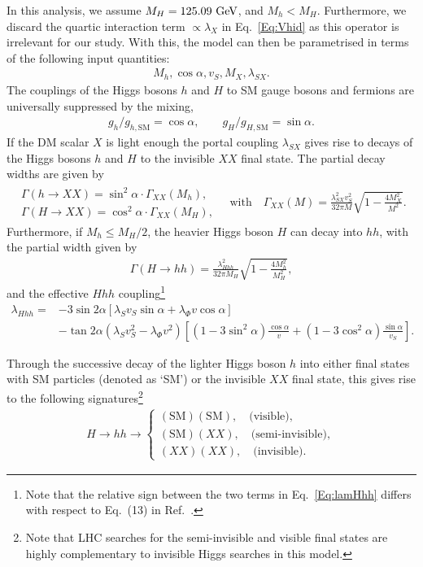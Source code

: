 \documentclass[../report.tex]{subfiles}
\begin{document}
In this analysis, we assume $M_H = 125.09~\text{GeV}$, and $M_h < M_H$. Furthermore, we discard the quartic interaction term $\propto \lambda_X$ in Eq.~\eqref{Eq:Vhid} as this operator is irrelevant for our study. With this, the model can then be parametrised in terms of the following input quantities:
\begin{align}
M_h, \cos\alpha, v_S, M_X, \lambda_{SX}.
\end{align}
The couplings of the Higgs bosons $h$ and $H$ to SM gauge bosons and fermions are universally suppressed by the mixing,
\begin{align}
g_h/g_{h,\mathrm{SM}} = \cos \alpha , \qquad g_H/g_{H,\mathrm{SM}} = \sin\alpha.
\end{align}
If the DM scalar $X$ is light enough the portal coupling $\lambda_{SX}$ gives rise to decays of the Higgs bosons $h$ and $H$ to the invisible $XX$ final state. The partial decay widths are given by
\begin{align}
\label{eq:invdecaywidth}
\begin{array}{l} \Gamma(h\to XX) = \sin^2\alpha \cdot \Gamma_{XX} (M_h), \\ \Gamma(H\to XX) = \cos^2\alpha \cdot \Gamma_{XX} (M_H), \end{array} \quad \mbox{with} \quad \Gamma_{XX}(M) = \frac{\lambda_{SX}^2 v_S^2 }{32\pi M} \sqrt{1 - \frac{4M_X^2}{M^2}}.
\end{align}
Furthermore, if $M_h \le M_H/2$, the heavier Higgs boson $H$ can decay into $hh$, with the partial width given by
\begin{align}
\Gamma(H\to hh) = \frac{\lambda_{Hhh}^2}{32\pi M_H} \sqrt{1 - \frac{4M_h^2}{M_H^2}},
\end{align}
and the effective $Hhh$ coupling\footnote{Note that the relative sign between the two terms in Eq.~\eqref{Eq:lamHhh} differs with respect to Eq.~(13) in Ref.~\cite{Englert:2011yb}.}
\begin{align}
\label{Eq:lamHhh}
\lambda_{Hhh} = & - 3\sin2\alpha \left[ \lambda_S v_S \sin\alpha  + \lambda_{\Phi} v \cos\alpha \right] \nonumber\\
& - \tan2\alpha \left( \lambda_S v_S^2 - \lambda_{\Phi} v^2 \right) \left[ (1-3\sin^2\alpha) \frac{\cos\alpha}{v} + (1-3 \cos^2\alpha) \frac{\sin\alpha}{v_S} \right].
\end{align}


Through the successive decay of the lighter Higgs boson $h$ into either final states with SM particles (denoted as `SM') or the invisible $XX$ final state, this gives rise to the following signatures\footnote{{Note that LHC searches for the semi-invisible and visible final states are highly complementary to invisible Higgs searches in this model.}}
\begin{align}
H \to hh \to \left\{ \begin{array}{l} (\mathrm{SM}) (\mathrm{SM}) ,\quad \mbox{(visible)}, \\ (\mathrm{SM}) (XX) ,\quad \mbox{(semi-invisible)}, \\
(XX) (XX) ,\quad \mbox{(invisible)}.
\end{array} \right.
\end{align}
\end{document}
